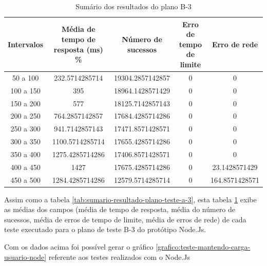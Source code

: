   \begin{table}[H]
    \centering
    \footnotesize
    \setlength{\abovecaptionskip}{0pt}
    \setlength{\belowcaptionskip}{0pt}
    \caption[Sumário dos resultados do plano B-3]{Sumário dos resultados do plano B-3}
    \label{tab:sumario-resultado-plano-teste-b-3}
    \begin{tabular}{c|c|c|c|c}
      \hline \hline
      Intervalos  & 	Média de tempo de resposta (ms) \% &	Número de sucessos & 	Erro de tempo de limite &	Erro de rede \\ 
      \hline \hline
      50 a 100 &		232.5714285714  &		19304.2857142857 & 	0 &				0 \\
      100 a 150&		395		&		18964.1428571429 & 	0  &				0 \\
      150 a 200&		577		&		18125.7142857143 & 	0 &				0 \\
      200 a 250&		764.2857142857  &		17684.4285714286 & 	0 &				0 \\
      250 a 300&		941.7142857143  &		17471.8571428571 & 	0 &				0 \\
      300 a 350&		1100.5714285714 &		17655.4285714286 & 	0 &				0 \\
      350 a 400&		1275.4285714286 &		17406.8571428571 & 	0 &				0 \\
      400 a 450&		1427		&		17675.4285714286 & 	0 &				23.1428571429 \\
      450 a 500&		1284.4285714286 &		12579.5714285714 & 	0 &				164.8571428571 \\
      \hline \hline
    \end{tabular}
  \end{table}
   
  Assim como a tabela \ref{tab:sumario-resultado-plano-teste-a-3}, esta tabela \ref{tab:sumario-resultado-plano-teste-b-3} exibe as médias 
  dos campos (média de tempo de resposta, média do número de sucessos, média de erros de tempo de limite, média de erros de rede) 
  de cada teste executado para o plano de teste B-3 do protótipo Node.Js.
  
  Com os dados acima foi possível gerar o gráfico \ref{grafico:teste-mantendo-carga-usuario-node} referente aos testes 
  realizados com o Node.Js

